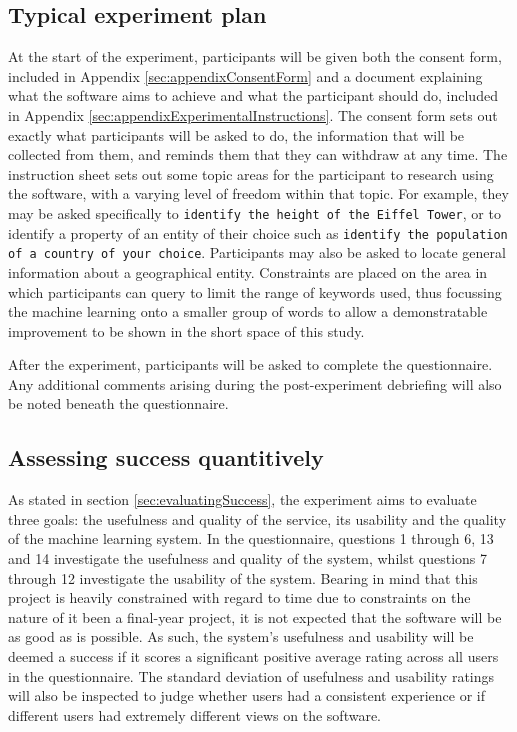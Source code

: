 \documentclass[authoryearcitations]{UoYCSproject}
\begin{document}
\subsection{Typical experiment plan}
\label{subsec:typicalExperiment}
At the start of the experiment, participants will be given both the consent form, included in Appendix \ref{sec:appendixConsentForm} and a document explaining what the software aims to achieve and what the participant should do, included in Appendix \ref{sec:appendixExperimentalInstructions}. The consent form sets out exactly what participants will be asked to do, the information that will be collected from them, and reminds them that they can withdraw at any time. The instruction sheet sets out some topic areas for the participant to research using the software, with a varying level of freedom within that topic. For example, they may be asked specifically to \texttt{identify the height of the Eiffel Tower}, or to identify a property of an entity of their choice such as \texttt{identify the population of a country of your choice}. Participants may also be asked to locate general information about a geographical entity. Constraints are placed on the area in which participants can query to limit the range of keywords used, thus focussing the machine learning onto a smaller group of words to allow a demonstratable improvement to be shown in the short space of this study.

After the experiment, participants will be asked to complete the questionnaire. Any additional comments arising during the post-experiment debriefing will also be noted beneath the questionnaire.

\subsection{Assessing success quantitively}
\label{subsec:assessingLearning}
As stated in section \ref{sec:evaluatingSuccess}, the experiment aims to evaluate three goals: the usefulness and quality of the service, its usability and the quality of the machine learning system. In the questionnaire, questions 1 through 6, 13 and 14 investigate the usefulness and quality of the system, whilst questions 7 through 12 investigate the usability of the system. Bearing in mind that this project is heavily constrained with regard to time due to constraints on the nature of it been a final-year project, it is not expected that the software will be as good as is possible. As such, the system's usefulness and usability will be deemed a success if it scores a significant positive average rating across all users in the questionnaire. The standard deviation of usefulness and usability ratings will also be inspected to judge whether users had a consistent experience or if different users had extremely different views on the software.
\end{document}
